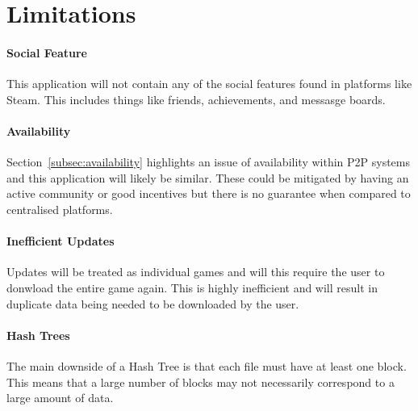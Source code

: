 
\section{Limitations}

\paragraph*{Social Feature}
This application will not contain any of the social features found in platforms like Steam. This includes things like friends, achievements, and messasge boards. 

\paragraph*{Availability}
Section~\ref{subsec:availability} highlights an issue of availability within P2P systems and this application will likely be similar. These could be mitigated by having an active community or good incentives but there is no guarantee when compared to centralised platforms. 

\paragraph*{Inefficient Updates}
Updates will be treated as individual games and will this require the user to donwload the entire game again. This is highly inefficient and will result in duplicate data being needed to be downloaded by the user.

\paragraph*{Hash Trees}
The main downside of a Hash Tree is that each file must have at least one block. This means that a large number of blocks may not necessarily correspond to a large amount of data.